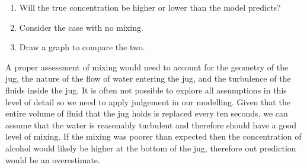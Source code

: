 \begin{parts}
	\begin{hints}
		\begin{enumerate}
			\item Will the true concentration be higher or lower than the model predicts?
			\item Consider the case with no mixing.
			\item Draw a graph to compare the two.
		\end{enumerate}
	\end{hints}
	
	\begin{solution}
	
		A proper assessment of mixing would need to account for the geometry of the jug, the nature of the flow of water entering the jug, and the turbulence of the fluids inside the jug. It is often not possible to explore all assumptions in this level of detail so we need to apply judgement in our modelling. Given that the entire volume of fluid that the jug holds is replaced every ten seconds, we can assume that the water is reasonably turbulent and therefore should have a good level of mixing. If the mixing was poorer than expected then the concentration of alcohol would likely be higher at the bottom of the jug, therefore out prediction would be an overestimate.
		

\end{solution}
\end{parts}
